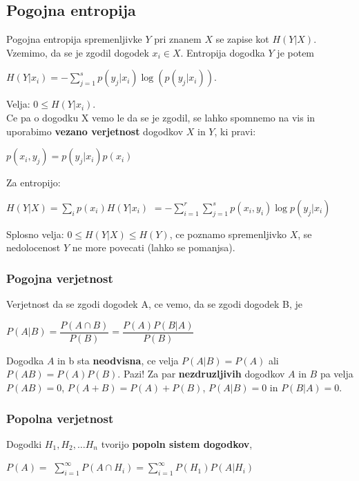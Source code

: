 \documentclass{article}
\begin{document}
\begin{multicols}{4}
	\subsection{Pogojna entropija}
	Pogojna entropija spremenljivke $Y$ pri znanem $X$ se zapise kot $H(Y|X)$.
	Vzemimo, da se je zgodil dogodek $x_i \in X$. Entropija dogodka $Y$ je potem
	\begin{center}
		\begin{math}
			H(Y|x_i) = - \sum_{j=1}^s p(y_j|x_i) \log(p(y_j| x_i)).
		\end{math}
	\end{center}
	Velja: $0 \leq H(Y| x_i)$.\\
	Ce pa o dogodku X vemo le da se je zgodil, se lahko spomnemo na vis in uporabimo
	\textbf{vezano verjetnost} dogodkov $X$ in $Y$, ki pravi:
	\begin{center}
		\begin{math}
			p(x_i, y_j) = p(y_j|x_i)p(x_i)
		\end{math}
	\end{center}
	Za entropijo:
	\begin{center}
		\begin{math}
			H(Y|X) = \sum_{i} p(x_i)H(Y|x_i)
		\end{math}
		\begin{math}
			= -\sum_{i=1}^r \sum_{j=1}^s p(x_i, y_i) \log p(y_j | x_i)
		\end{math}
	\end{center}
	Splosno velja: $0 \leq H(Y|X) \leq H(Y)$, ce poznamo spremenljivko $X$, se nedolocenost $Y$ ne more povecati (lahko se pomanjsa).

	\subsubsection{Pogojna verjetnost}
	Verjetnost da se zgodi dogodek A, ce vemo, da se zgodi dogodek B, je
	\begin{center}
		\begin{math}
			P(A | B) = \dfrac{P(A \cap B)}{P(B)} = \dfrac{P(A)P(B|A)}{P(B)}
		\end{math}
	\end{center}
	Dogodka $A$ in b sta \textbf{neodvisna}, ce velja $P(A | B) = P(A)$ ali
	$P(A B) = P(A)P(B)$.
	Pazi! Za par \textbf{nezdruzljivih} dogodkov $A$ in $B$
	pa velja $P(AB) = 0$,  $P(A + B) = P(A) + P(B)$, $P(A|B) = 0$ in $P(B|A) = 0$.

	\subsubsection{Popolna verjetnost}
	Dogodki $H_{1}, H_{2}, \dots H_{n}$ tvorijo \textbf{popoln sistem dogodkov},
	\begin{center}
		\begin{math}
			P(A) =
		\end{math}
		\smallskip
		\begin{math}
			\sum_{i=1}^{\infty} P(A \cap H_{i}) =
			\sum_{i=1}^{\infty} P(H_{1}) P(A | H_{i})
		\end{math}
	\end{center}


\end{multicols}
\end{document}
